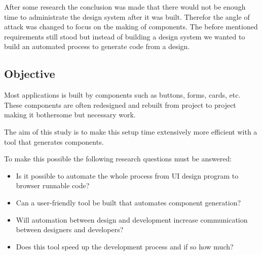 After some research the conclusion was made that there would not be enough time to administrate the design system after it was built. Therefor the angle of attack was changed to focus on the making of components. The before mentioned requirements still stood but instead of building a design system we wanted to build an automated process to generate code from a design. 








\subsection{Objective}
\label{sub:Objective}
Most applications is built by components such as buttons, forms, cards\cite{babichSimpleDesignTips2020}, etc. These components are often redesigned and rebuilt from project to project making it bothersome but necessary work.


The aim of this study is to make this setup time extensively more efficient with a tool that generates components. 

To make this possible the following research questions must be answered:
\begin{itemize}
  \item Is it possible to automate the whole process from UI design program to browser runnable code? 
  \item Can a user-friendly tool be built that automates component generation?  
  \item Will automation between design and development increase communication between designers and developers?
  \item Does this tool speed up the development process and if so how much?
\end{itemize}


